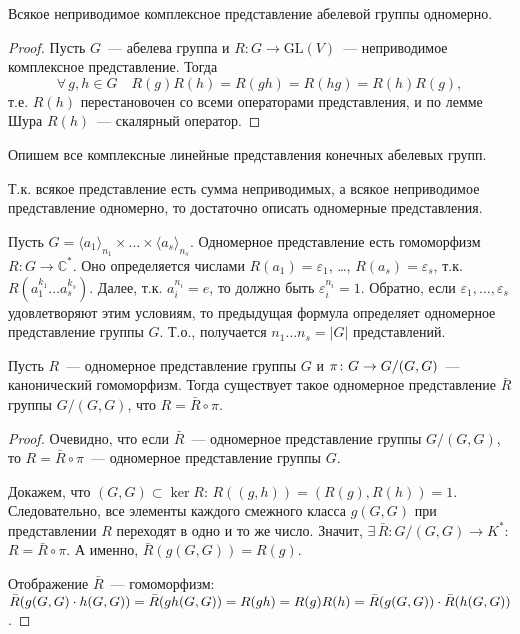 \documentclass[a4paper]{article}
\newcommand*{\p}[1]{#1\nobreak\discretionary{}{\hbox{$\mathsurround=0pt #1$}}{}}
\begin{document}
\begin{imp}
Всякое неприводимое комплексное представление абелевой группы
одномерно.
\end{imp}

\begin{proof}
Пусть $G$~--- абелева группа и $R\colon G\to \mathrm{GL}(V)$~---
неприводимое комплексное представление. Тогда $$\forall \, g,h\in
G\quad R(g)R(h)=R(gh)=R(hg)=R(h)R(g),$$ т.е. $R(h)$ перестановочен
со всеми операторами представления, и по лемме Шура $R(h)$~---
скалярный оператор.
\end{proof}

Опишем все комплексные линейные представления конечных абелевых
групп.

Т.к. всякое представление есть сумма неприводимых, а всякое
неприводимое представление одномерно, то достаточно описать
одномерные представления.

Пусть $G=\langle a_1\rangle_{n_1}\times\ldots\times \langle
a_s\rangle_{n_s}$. Одномерное представление есть гомоморфизм
$R\colon G\to \mathbb{C}^*$. Оно определяется числами
$R(a_1)=\varepsilon_1$, \ldots, $R(a_s)=\varepsilon_s$, т.к.
$R(a_1^{k_1}\ldots a_s^{k_s})$. Далее, т.к. $a_i^{n_i}=e$, то должно
быть $\varepsilon_i^{n_i}=1$. Обратно, если
$\varepsilon_1,\ldots,\varepsilon_s$ удовлетворяют этим условиям, то
предыдущая формула определяет одномерное представление группы $G$.
Т.о., получается $n_1\ldots n_s=|G|$ представлений.

\begin{theorem}
Пусть $R$~--- одномерное представление группы $G$ и $\pi\colon
G\p\to G/(G,G)$~--- канонический гомоморфизм. Тогда существует такое
одномерное представление $\bar{R}$ группы $G/(G,G)$, что
$R=\bar{R}\circ\pi$.
\end{theorem}

\begin{proof}
Очевидно, что если $\bar{R}$~--- одномерное представление группы
$G/(G,G)$, то $R=\bar{R}\circ \pi$~--- одномерное представление
группы $G$.

Докажем, что $(G,G)\subset\ker R$: $R((g,h))=(R(g),R(h))=1$.
Следовательно, все элементы каждого смежного класса $g(G,G)$ при
представлении $R$ переходят в одно и то же число. Значит, $\exists
\, \bar{R}: G/(G,G)\to K^*$: $R=\bar{R}\circ\pi$. А именно,
$\bar{R}(g(G,G))=R(g)$.

Отображение $\bar{R}$~--- гомоморфизм: $\bar{R}(g(G,G)\cdot
h(G,G))=\bar{R}(gh(G,G))\p=R(gh)=R(g)R(h)=\bar{R}(g(G,G))\cdot
\bar{R}(h(G,G))$.
\end{proof}
\end{document}
